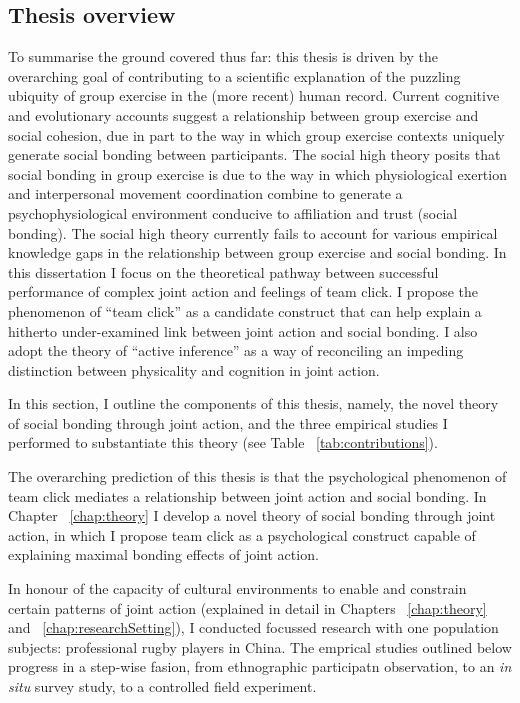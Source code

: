 \begin{CJK}{UTF8}{gbsn}
\section{Thesis overview}

To summarise the ground covered thus far: this thesis is driven by the overarching goal of contributing to a scientific explanation of the puzzling ubiquity of group exercise in the (more recent) human record. Current cognitive and evolutionary accounts suggest a relationship between group exercise and social cohesion, due in part to the way in which group exercise contexts uniquely generate social bonding between participants.  The social high theory posits that social bonding in group exercise is due to the way in which physiological exertion and interpersonal movement coordination combine to generate a psychophysiological environment conducive to affiliation and trust (social bonding).  The social high theory currently fails to account for various empirical knowledge gaps in the relationship between group exercise and social bonding.  In this dissertation I focus on the theoretical pathway between successful performance of complex joint action and feelings of team click.  I propose the phenomenon of ``team click'' as a candidate construct that can help explain a hitherto under-examined link between joint action and social bonding.  I also adopt the theory of ``active inference'' as a way of reconciling an impeding distinction between physicality and cognition in joint action.

In this section, I outline the components of this thesis, namely, the novel theory of social bonding through joint action, and the three empirical studies I performed to substantiate this theory (see Table ~\ref{tab:contributions}).




  The overarching prediction of this thesis is that the psychological phenomenon of team click mediates a relationship between joint action and social bonding.  In Chapter ~\ref{chap:theory} I develop a novel theory of social bonding through joint action, in which I propose team click as a psychological construct capable of explaining maximal bonding effects of joint action.


In honour of the capacity of cultural environments to enable and constrain certain patterns of joint action (explained in detail in Chapters ~\ref{chap:theory} and ~\ref{chap:researchSetting}), I conducted focussed research with one population subjects: professional rugby players in China.  The emprical studies outlined below progress in a step-wise fasion, from ethnographic participatn observation, to an \textit{in situ} survey study, to a controlled field experiment.


\end{CJK}
